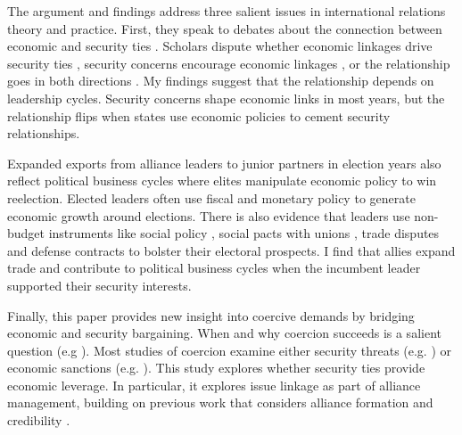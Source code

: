 \documentclass[12pt]{article}
\begin{document}
The argument and findings address three salient issues in international relations theory and practice. 
First, they speak to debates about the connection between economic and security ties \citep{Mastanduno2009, Poast2019}. 
Scholars dispute whether economic linkages drive security ties \citep{BiglaiserDeRouen2007, Fordham2010, Kimball2010}, security concerns encourage economic linkages \citep{Gowa1995, Li2003, LongLeeds2006, GowaMansfield2004}, or the relationship goes in both directions \citep{BiglaiserDeRouen2009, KinneBunte2018}. 
My findings suggest that the relationship depends on leadership cycles. 
Security concerns shape economic links in most years, but the relationship flips when states use economic policies to cement security relationships.


Expanded exports from alliance leaders to junior partners in election years also reflect political business cycles where elites manipulate economic policy to win reelection. 
Elected leaders often use fiscal \citep{Rogoff1987} and monetary policy \citep{ClarkHallerberg2000} to generate economic growth around elections. 
There is also evidence that leaders use non-budget instruments like social policy \citep{Philips2020}, social pacts with unions \citep{Ahlquist2010}, trade disputes \citep{Conconietal2017} and defense contracts \citep{DerouenHeo2000} to bolster their electoral prospects. 
I find that allies expand trade and contribute to political business cycles when the incumbent leader supported their security interests.


Finally, this paper provides new insight into coercive demands by bridging economic and security bargaining.
When and why coercion succeeds is a salient question (e.g \citep{Sechser2010, Sechser2018, Cebuletal2021}).  
Most studies of coercion examine either security threats (e.g. \citep{HorowitzReiter2001, Sechser2011}) or economic sanctions (e.g. \citep{Marinov2005, Allen2008, Escriba-FolchWright2010}).
This study explores whether security ties provide economic leverage. 
In particular, it explores issue linkage as part of alliance management, building on previous work that considers alliance formation \citep{Poast2012} and credibility \citep{Davis2008, Poast2013}. 


\end{document}
